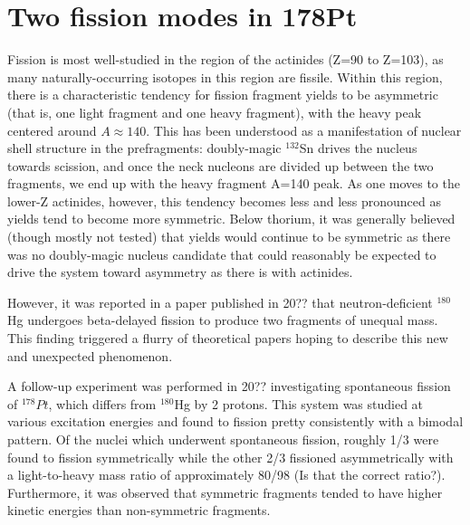 \chapter{Two fission modes in 178Pt}\label{chap:178Pt}

\maketitle

Fission is most well-studied in the region of the actinides (Z=90 to Z=103), as many naturally-occurring isotopes in this region are fissile. Within this region, there is a characteristic tendency for fission fragment yields to be asymmetric (that is, one light fragment and one heavy fragment), with the heavy peak centered around $A\approx140$. This has been understood as a manifestation of nuclear shell structure in the prefragments: doubly-magic $^{132}$Sn drives the nucleus towards scission, and once the neck nucleons are divided up between the two fragments, we end up with the heavy fragment A=140 peak. As one moves to the lower-Z actinides, however, this tendency becomes less and less pronounced as yields tend to become more symmetric. Below thorium, it was generally believed (though mostly not tested) that yields would continue to be symmetric as there was no doubly-magic nucleus candidate that could reasonably be expected to drive the system toward asymmetry as there is with actinides.

However, it was reported in a paper published in 20?? \cite{Andreyev20??} that neutron-deficient $^{180}$Hg undergoes beta-delayed fission to produce two fragments of unequal mass. This finding triggered a flurry of theoretical papers hoping to describe this new and unexpected phenomenon.

A follow-up experiment was performed in 20?? \cite{our-Pt-paper} investigating spontaneous fission of $^{178}Pt$, which differs from $^{180}$Hg by 2 protons. This system was studied at various excitation energies and found to fission pretty consistently with a bimodal pattern. Of the nuclei which underwent spontaneous fission, roughly 1/3 were found to fission symmetrically while the other 2/3 fissioned asymmetrically with a light-to-heavy mass ratio of approximately 80/98 (Is that the correct ratio?). Furthermore, it was observed that symmetric fragments tended to have higher kinetic energies than non-symmetric fragments. 

